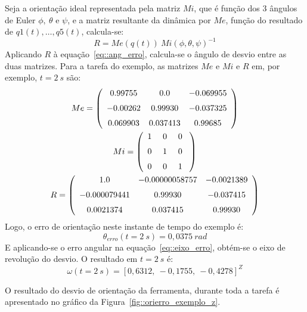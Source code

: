 Seja a orientação ideal representada pela matriz $Mi$, que é função dos 3
ângulos de Euler $\phi,~\theta$ e $\psi$, e a matriz resultante da dinâmica por
$Me$, função do resultado de $q1(t),\ldots,q5(t)$, calcula-se:
%
\begin{equation}
	R = Me(q(t))~Mi(\phi,\theta,\psi)^{-1}
\end{equation}
%
Aplicando $R$ à equação~\ref{eq::ang_erro}, calcula-se o ângulo de desvio entre
as duas matrizes.
Para a tarefa do exemplo, as matrizes $Me$ e $Mi$ e $R$ em, por exemplo,
$t=2~s$ são:
%
 \begin{gather*}
 Me = \left( \begin {array}{ccc}  0.99755& 0.0&- 0.069955
\\ \noalign{\medskip}- 0.00262& 0.99930&- 0.037325
\\ \noalign{\medskip} 0.069903& 0.037413& 0.99685\end {array} \right) \\
 Mi =  \left( \begin {array}{ccc}  1~& 0~& 0~\\ \noalign{\medskip} 0~&
 1~& 0~\\ \noalign{\medskip} 0~& 0~& 1~\end {array} \right) \\
R =  \left( \begin {array}{ccc}  1.0&- 0.00000058757&- 0.0021389
\\ \noalign{\medskip}- 0.000079441& 0.99930&- 0.037415
\\ \noalign{\medskip} 0.0021374& 0.037415& 0.99930\end {array}
 \right)
\end{gather*}
%
Logo, o erro de orientação neste instante de tempo do exemplo é:
%
\begin{equation*}
	\theta_{erro}(t=2~s) = 0,0375~rad
\end{equation*}
%
E aplicando-se o erro angular na equação~\ref{eq::eixo_erro}, obtém-se o eixo de
revolução do desvio. O resultado em $t=2~s$ é:
%
\begin{equation}
	\omega(t=2~s) = [0,6312,~-0,1755,~-0,4278]^Z
\end{equation}
%


O resultado do desvio de orientação da ferramenta, durante toda a tarefa é
apresentado no gráfico da Figura~\ref{fig::orierro_exemplo_z}.

